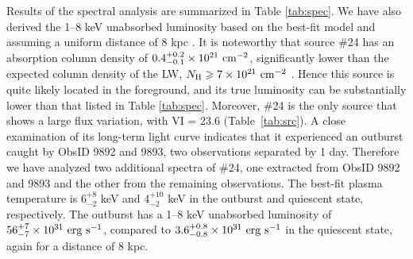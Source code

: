 \documentclass[fleqn,usenatbib]{mnras}
\begin{document}

Results of the spectral analysis are summarized in Table \ref{tab:spec}. We have also derived the 1--8 keV unabsorbed luminosity based on the best-fit model and assuming a uniform distance of 8 kpc \citep{2009ApJ...705.1548R}.
It is noteworthy that source \#24 has an absorption column density of $0.4^{+0.2}_{-0.1}\times10^{21}{\rm~cm^{-2}}$, significantly lower than the expected column density of the LW, $N_{\rm H} \geq 7\times10^{21}{\rm~cm^{-2}}$ \citep{2011MNRAS.414..495R}. Hence 
this source is quite likely located in the foreground, and its true luminosity can be substantially lower than that listed in Table \ref{tab:spec}. 
Moreover, \#24 is the only source that shows a large flux variation, with VI = 23.6 (Table~\ref{tab:src}). A close examination of its long-term light curve indicates that it experienced an outburst caught by ObsID 9892 and 9893, two observations separated by 1 day. Therefore we have analyzed two additional spectra of \#24, one extracted from ObsID 9892 and 9893 and the other from the remaining observations. 
The best-fit plasma temperature is $6_{-2}^{+8}$ keV and $4_{-2}^{+10}$ keV in the outburst and quiescent state, respectively. 
The outburst has a 1--8 keV unabsorbed luminosity of $56^{+7}_{-7}\times10^{31}{\rm~erg~s^{-1}}$, compared to $3.6^{+0.8}_{-0.8}\times10^{31}{\rm~erg~s^{-1}}$ in the quiescent state, again for a distance of 8 kpc.
\end{document}
